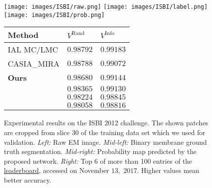 \documentclass[10pt,twocolumn,letterpaper]{article}
\begin{document}
\begin{figure*}[!ht]
	\texttt{[image: images/ISBI/raw.png]}
	\hspace{.4ex}
	\texttt{[image: images/ISBI/label.png]}
	\hspace{.4ex}
	\texttt{[image: images/ISBI/prob.png]}
	\hspace{2.ex}
	\begin{minipage}{0.30\textwidth}
	\vspace{-13.75ex}
	\footnotesize
	\renewcommand{\arraystretch}{.925}
	\begin{tabular}{l@{\hskip 2.5ex}l@{\hskip 2.5ex}l@{\hskip .4ex}}
		\midrule \vspace{-1pt}
		Method							& $V^\text{Rand}$    & $V^\text{Info}$ \\[-1pt]
		\midrule
		IAL MC/LMC						& $\mathbf{0.98792}$ & $\mathbf{0.99183}$ \\
		CASIA\_MIRA						& $0.98788$ & $0.99072$ \\
		\textbf{Ours}					& $0.98680$ & $0.99144$ \\
		\citet{quan2016fusionnet}		& $0.98365$ & $0.99130$ \\
		\citet{beier2017multicut}		& $0.98224$ & $0.98845$ \\
		\citet{drozdzal2016importance}	& $0.98058$ & $0.98816$ \\[-1pt]
		\midrule
	\end{tabular}
	\end{minipage}
	\vspace{-2ex}
	\caption{
		Experimental results on the ISBI 2012 challenge. The shown patches are cropped from slice $30$ of the training data set which we used for validation.
		\emph{Left:} Raw EM image.
		\emph{Mid-left:} Binary membrane ground truth segmentation.
		\emph{Mid-right:} Probability map predicted by the proposed network.
		\emph{Right:} Top 6 of more than 100 entries of the \href{http://brainiac2.mit.edu/isbi_challenge/leaders-board-new}{leaderboard}, accessed on November $13,$ $2017.$ Higher values mean better accuracy.
	}
	\label{fig:ISBI_samples}
	\vspace{-2.4ex}
\end{figure*}
\end{document}
